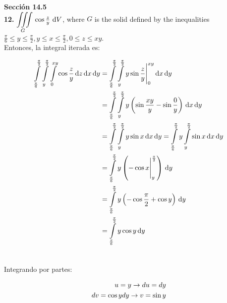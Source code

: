 \documentclass[11pt]{report}
\begin{document}
\textbf{Sección 14.5} \\

\textbf{12.} $ {\displaystyle \iiint \limits_G } \, \cos{\frac{z}{y}} \, \, \text dV $,
where $G$ is the solid defined by the inequalities
$\frac{\pi}{6} \leq y \leq \frac{\pi}{2}, y \leq x \leq \frac{\pi}{2}, 0 \leq z \leq xy$. \\

Entonces, la integral iterada es:

\begin{equation}
\begin{split}
        \int \limits_{\frac{\pi}{6}}^{\frac{\pi}{2}}
        \int \limits_{y}^{\frac{\pi}{2}}
        \int \limits_0^{xy} \cos{\frac{z}{y}} \, \text dz \, \text dx \, \text dy
        &=
        \int \limits_{\frac{\pi}{6}}^{\frac{\pi}{2}}
        \int \limits_{y}^{\frac{\pi}{2}}
        y \sin{\frac{z}{y}} \Bigg|_0^{xy}  \, \text dx \, \text dy \\ \notag
        &=
        \int \limits_{\frac{\pi}{6}}^{\frac{\pi}{2}}
        \int \limits_{y}^{\frac{\pi}{2}}
        y \left( \sin{\frac{xy}{y}} - \sin{\frac{0}{y}} \right) \, \text dx \, \text dy \\ \notag
        &=
        \int \limits_{\frac{\pi}{6}}^{\frac{\pi}{2}}
        \int \limits_{y}^{\frac{\pi}{2}}
        y \sin{x} \, \text dx \, \text dy
        =
        \int \limits_{\frac{\pi}{6}}^{\frac{\pi}{2}} y
        \int \limits_{y}^{\frac{\pi}{2}}
        \sin{x} \, \text dx \, \text dy \\ \notag
        &=
        \int \limits_{\frac{\pi}{6}}^{\frac{\pi}{2}} y
        \left(-\cos{x} \Bigg|_y^{\frac{\pi}{2}} \right) \, \text dy \\ \notag
        &=
        \int \limits_{\frac{\pi}{6}}^{\frac{\pi}{2}} y
        \left(-\cos{\frac{\pi}{2}} + \cos{y} \right) \, \text dy \\ \notag
        &=
        \int \limits_{\frac{\pi}{6}}^{\frac{\pi}{2}} y
        \cos{y} \, \text dy \\ \notag
\end{split}
\end{equation}

Integrando por partes:

\begin{equation}
\begin{split}
        u = y \rightarrow du = dy \\ \notag
        dv = \cos{y} dy \rightarrow v = \sin{y}
\end{split}
\end{equation}
\end{document}
